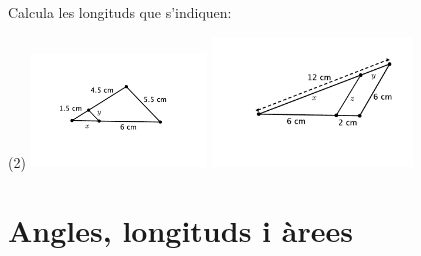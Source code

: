 \begin{mylist}
\exer  Calcula les longituds que s'indiquen:
\begin{tasks}(2)
	\task    \includegraphics[width=0.35\textwidth]{img-09/trig-semblant3}
	\task   \includegraphics[width=0.4\textwidth]{img-09/trig-semblant4}
\end{tasks}

\answers[cols=1]{[$x=2$; $y=1.375$ cm,  $x=9$; $y=3$; $z=4.5$ cm]}

\end{mylist}
 


\section{Angles, longituds i àrees}

